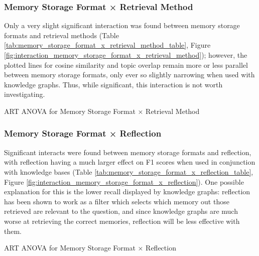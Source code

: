 \subsubsection{Memory Storage Format × Retrieval Method}

Only a very slight significant interaction was found between memory storage formats and retrieval methods (Table \ref{tab:memory_storage_format_x_retrieval_method_table}, Figure \ref{fig:interaction_memory_storage_format_x_retrieval_method}); however, the plotted lines for cosine similarity and topic overlap remain more or less parallel between memory storage formats, only ever so slightly narrowing when used with knowledge graphs. Thus, while significant, this interaction is not worth investigating.

\begin{table}[htbp]
\centering
\tiny

\caption{ART ANOVA for Memory Storage Format × Retrieval Method}
\label{tab:memory_storage_format_x_retrieval_method_table}
\end{table}


\subsubsection{Memory Storage Format × Reflection}

Significant interacts were found between memory storage formats and reflection, with reflection having a much larger effect on F1 scores when used in conjunction with knowledge bases (Table \ref{tab:memory_storage_format_x_reflection_table}, Figure \ref{fig:interaction_memory_storage_format_x_reflection}). One possible explanation for this is the lower recall displayed by knowledge graphs: reflection has been shown to work as a filter which selects which memory out those retrieved are relevant to the question, and since knowledge graphs are much worse at retrieving the correct memories, reflection will be less effective with them.

\begin{table}[htbp]
\centering
\tiny

\caption{ART ANOVA for Memory Storage Format × Reflection}
\label{tab:memory_storage_format_x_reflection_table}
\end{table}


